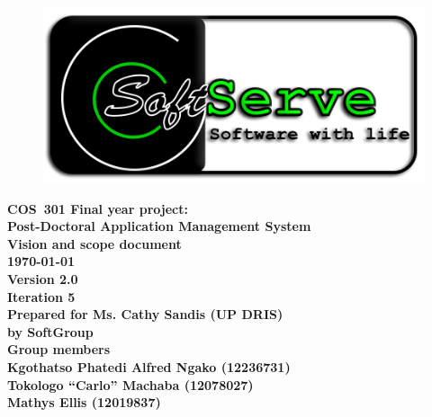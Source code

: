 \documentclass[12pt]{article}
\newcommand{\Title}{Vision and scope document} %
\newcommand{\Class}{COS\ 301 Final year project:} %
\newcommand{\ssr}{Soft\color{green}{Serve }\color{black}}
\newcommand{\version}{2.0}
\newcommand{\iteration}{5}
\newcommand{\client}{Ms. Cathy Sandis (UP DRIS)}
\newcommand{\project}{Post-Doctoral Application Management System}
\begin{document}
\vspace{4em}

\begin{center}%

\begin{figure}[ht!]
\centering
\includegraphics{../Images_Docs/logo.png}
\end{figure}
\LARGE \bf \Class \\[0.25em]
\LARGE \bf \project \\[1em]
\LARGE \bf \Title \\[0.25em]
\large \bf \today\\
\bf Version \version\\
\bf Iteration \iteration\\[0.5em]
\Large \bf Prepared for \client\\
\Large \bf by
\Large {\bf \ssr Group }\\[0.5em]
\LARGE {\bf Group members}\\[0.25em]
\large
Kgothatso Phatedi Alfred Ngako (12236731) \\[0.5em]
Tokologo “Carlo” Machaba (12078027) \\[0.5em]
Mathys Ellis (12019837) \\[8em]

\end{center}%

\end{document}
